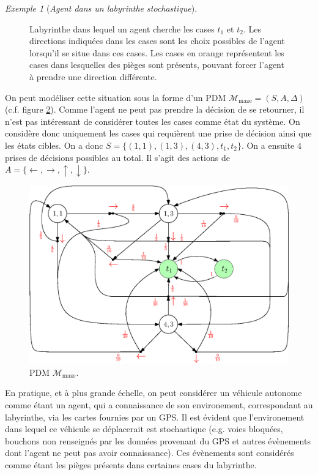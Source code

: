 \documentclass[12pt,a4paper]{report}
\theoremstyle{definition}%
\theoremstyle{remark}
\newtheorem{example}{Exemple}[chapter]
\begin{document}
\begin{example}[\textit{Agent dans un labyrinthe stochastique}]
\begin{figure}[H]
		\caption{Labyrinthe dans lequel un agent cherche les cases $t_1$ et $t_2$.
			Les directions indiquées dans les cases sont les choix possibles de
			l'agent lorsqu'il se situe dans ces cases. Les cases en orange
			représentent les cases dans lesquelles des pièges sont présents, pouvant
			forcer l'agent à prendre une direction différente.}
		\label{maze-figure}
	\end{figure}
	On peut modéliser cette situation sous la forme d'un PDM
	$\mathcal{M}_{\text{maze}} = (S, A, \Delta)$ (c.f. figure \ref{PDM-maze-figure}). Comme l'agent ne peut pas
	prendre la décision de se retourner, il n'est pas intéressant de considérer
	toutes les cases comme état du système. On considère donc uniquement les
	cases qui requièrent une prise de décision ainsi que les états cibles.
	On a donc
	$S = \{ (1,1), (1,3), (4,3), t_1, t_2 \}$. On a ensuite $4$ prises de
	décisions possibles au total. Il s'agit des actions de $A = \{ \leftarrow,
	\rightarrow, \uparrow, \downarrow \}$.
	\begin{figure}[H]
		\centering
		\captionsetup{justification=centering}
		\includegraphics[scale=0.75]{figures/mazePDM}
		\caption{PDM $\mathcal{M}_{\text{maze}}$.}
		\label{PDM-maze-figure}
	\end{figure}

	En pratique, et à plus grande échelle, on peut considérer un véhicule autonome comme étant un agent,
	qui a connaissance de son environement, correspondant au labyrinthe, via les cartes fournies par un GPS.
	Il est évident que l'environement dans lequel ce véhicule se déplacerait
	est stochastique (e.g. voies bloquées, bouchons non renseignés par les
	données provenant du GPS et autres évènements dont l'agent ne peut pas
	avoir connaissance). Ces évènements sont considérés comme étant
	les pièges présents dans certaines cases du labyrinthe.

\end{example}
\end{document}
